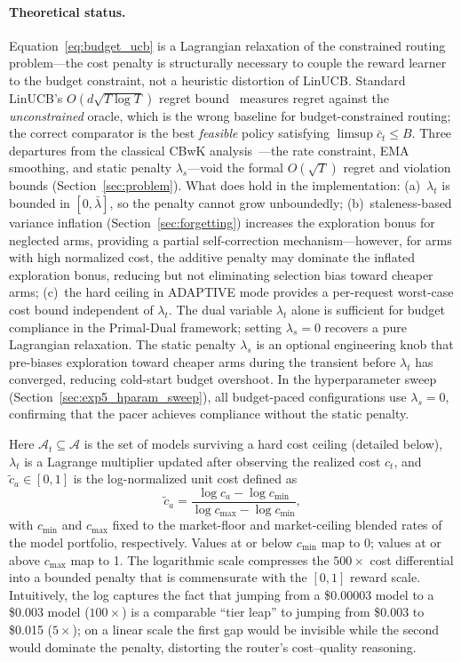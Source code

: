\paragraph{Theoretical status.}
Equation~\ref{eq:budget_ucb} is a Lagrangian relaxation of the constrained routing problem---the cost penalty is structurally necessary to couple the reward learner to the budget constraint, not a heuristic distortion of LinUCB.
Standard LinUCB's $O(d\sqrt{T \log T})$ regret bound~\cite{abbasi2011improved} measures regret against the \emph{unconstrained} oracle, which is the wrong baseline for budget-constrained routing; the correct comparator is the best \emph{feasible} policy satisfying $\limsup \bar{c}_t \leq B$.
Three departures from the classical CBwK analysis~\cite{agrawal2014bandits}---the rate constraint, EMA smoothing, and static penalty $\lambda_s$---void the formal $O(\sqrt{T})$ regret and violation bounds (Section~\ref{sec:problem}).
What does hold in the implementation:
(a)~$\lambda_t$ is bounded in $[0, \bar\lambda]$, so the penalty cannot grow unboundedly;
(b)~staleness-based variance inflation (Section~\ref{sec:forgetting}) increases the exploration bonus for neglected arms, providing a partial self-correction mechanism---however, for arms with high normalized cost, the additive penalty may dominate the inflated exploration bonus, reducing but not eliminating selection bias toward cheaper arms;
(c)~the hard ceiling in ADAPTIVE mode provides a per-request worst-case cost bound independent of $\lambda_t$.
The dual variable $\lambda_t$ alone is sufficient for budget compliance in the Primal-Dual framework; setting $\lambda_s = 0$ recovers a pure Lagrangian relaxation.
The static penalty $\lambda_s$ is an optional engineering knob that pre-biases exploration toward cheaper arms during the transient before $\lambda_t$ has converged, reducing cold-start budget overshoot.
In the hyperparameter sweep (Section~\ref{sec:exp5_hparam_sweep}), all budget-paced configurations use $\lambda_s = 0$, confirming that the pacer achieves compliance without the static penalty.

Here $\mathcal{A}_t \subseteq \mathcal{A}$ is the set of models surviving a hard cost ceiling (detailed below), $\lambda_t$ is a Lagrange multiplier updated after observing the realized cost $c_t$, and $\tilde{c}_a \in [0,1]$ is the log-normalized unit cost defined as
\begin{equation}
    \tilde{c}_a = \frac{\log c_a - \log c_{\min}}{\log c_{\max} - \log c_{\min}},
    \label{eq:cost_norm}
\end{equation}
with $c_{\min}$ and $c_{\max}$ fixed to the market-floor and market-ceiling blended rates of the model portfolio, respectively. Values at or below $c_{\min}$ map to 0; values at or above $c_{\max}$ map to 1. The logarithmic scale compresses the $500\times$ cost differential into a bounded penalty that is commensurate with the $[0,1]$ reward scale.  Intuitively, the log captures the fact that jumping from a \$0.00003 model to a \$0.003 model ($100\times$) is a comparable ``tier leap'' to jumping from \$0.003 to \$0.015 ($5\times$); on a linear scale the first gap would be invisible while the second would dominate the penalty, distorting the router's cost--quality reasoning.

